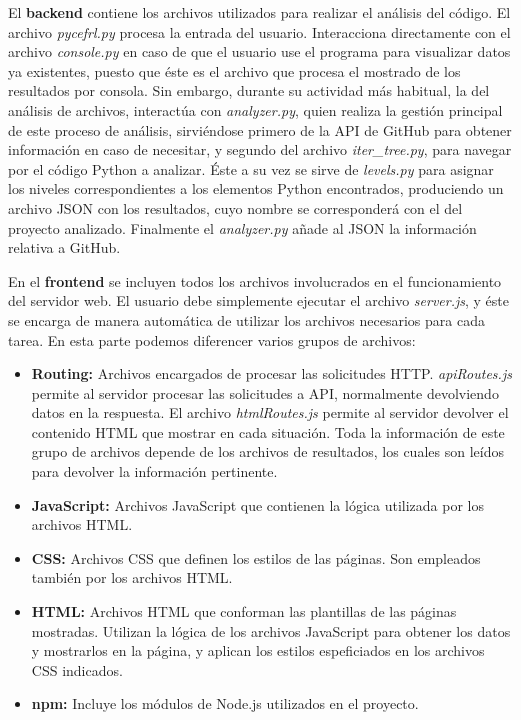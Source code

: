 \documentclass[a4paper, 12pt]{book}
\begin{document}
El \textbf{backend} contiene los archivos utilizados para realizar el análisis del código. El archivo \textit{pycefrl.py} procesa la entrada del usuario. Interacciona directamente con el archivo \textit{console.py} en caso de que el usuario use el programa para visualizar datos ya existentes, puesto que éste es el archivo que procesa el mostrado de los resultados por consola. Sin embargo, durante su actividad más habitual, la del análisis de archivos, interactúa con \textit{analyzer.py}, quien realiza la gestión principal de este proceso de análisis, sirviéndose primero de la API de GitHub para obtener información en caso de necesitar, y segundo del archivo \textit{iter\_tree.py}, para navegar por el código Python a analizar. Éste a su vez se sirve de \textit{levels.py} para asignar los niveles correspondientes a los elementos Python encontrados, produciendo un archivo JSON con los resultados, cuyo nombre se corresponderá con el del proyecto analizado. Finalmente el \textit{analyzer.py} añade al JSON la información relativa a GitHub. 

En el \textbf{frontend} se incluyen todos los archivos involucrados en el funcionamiento del servidor web. El usuario debe simplemente ejecutar el archivo \textit{server.js}, y éste se encarga de manera automática de utilizar los archivos necesarios para cada tarea. En esta parte podemos diferencer varios grupos de archivos:

\begin{itemize}
    \item \textbf{Routing:} Archivos encargados de procesar las solicitudes HTTP. \textit{apiRoutes.js} permite al servidor procesar las solicitudes a API, normalmente devolviendo datos en la respuesta. El archivo \textit{htmlRoutes.js} permite al servidor devolver el contenido HTML que mostrar en cada situación. Toda la información de este grupo de archivos depende de los archivos de resultados, los cuales son leídos para devolver la información pertinente.

    \item \textbf{JavaScript:} Archivos JavaScript que contienen la lógica utilizada por los archivos HTML.

    \item \textbf{CSS:} Archivos CSS que definen los estilos de las páginas. Son empleados también por los archivos HTML.
    
    \item \textbf{HTML:} Archivos HTML que conforman las plantillas de las páginas mostradas. Utilizan la lógica de los archivos JavaScript para obtener los datos y mostrarlos en la página, y aplican los estilos espeficiados en los archivos CSS indicados.

    \item \textbf{npm:} Incluye los módulos de Node.js utilizados en el proyecto.
\end{itemize}
\end{document}
